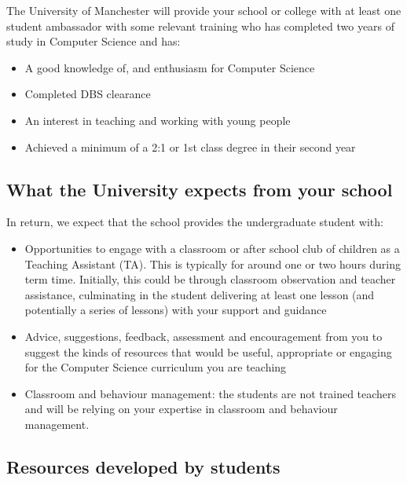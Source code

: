 \documentclass[12pt,]{book}
\providecommand{\tightlist}{%
  \setlength{\itemsep}{0pt}\setlength{\parskip}{0pt}}
\begin{document}
The University of Manchester will provide your school or college with at least one student ambassador with some relevant training who has completed two years of study in Computer Science and has:

\begin{itemize}
\tightlist
\item
  A good knowledge of, and enthusiasm for Computer Science
\item
  Completed DBS clearance
\item
  An interest in teaching and working with young people
\item
  Achieved a minimum of a 2:1 or 1st class degree in their second year
\end{itemize}

\hypertarget{what-the-university-expects-from-your-school}{%
\subsection{What the University expects from your school}\label{what-the-university-expects-from-your-school}}

In return, we expect that the school provides the undergraduate student with:

\begin{itemize}
\tightlist
\item
  Opportunities to engage with a classroom or after school club of children as a Teaching Assistant (TA). This is typically for around one or two hours during term time. Initially, this could be through classroom observation and teacher assistance, culminating in the student delivering at least one lesson (and potentially a series of lessons) with your support and guidance
\item
  Advice, suggestions, feedback, assessment and encouragement from you to suggest the kinds of resources that would be useful, appropriate or engaging for the Computer Science curriculum you are teaching
\item
  Classroom and behaviour management: the students are not trained teachers and will be relying on your expertise in classroom and behaviour management.
\end{itemize}

\hypertarget{resources-developed-by-students}{%
\subsection{Resources developed by students}\label{resources-developed-by-students}}
\end{document}
